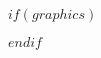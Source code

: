 $if(graphics)$
\usepackage{graphicx}
\makeatletter
\newsavebox\pandoc@box
\newcommand*\pandocbounded[1]{%
	\sbox\pandoc@box{#1}%
	\Gscale@div\@tempa{\textheight}{\dimexpr\ht\pandoc@box+\dp\pandoc@box\relax}%
	\Gscale@div\@tempb{\linewidth}{\wd\pandoc@box}%
	\ifdim\@tempb\p@<\@tempa\p@\let\@tempa\@tempb\fi%
	\ifdim\@tempa\p@<\p@\scalebox{\@tempa}{\usebox\pandoc@box}%
	\else\usebox{\pandoc@box}%
	\fi%
}
$endif$
